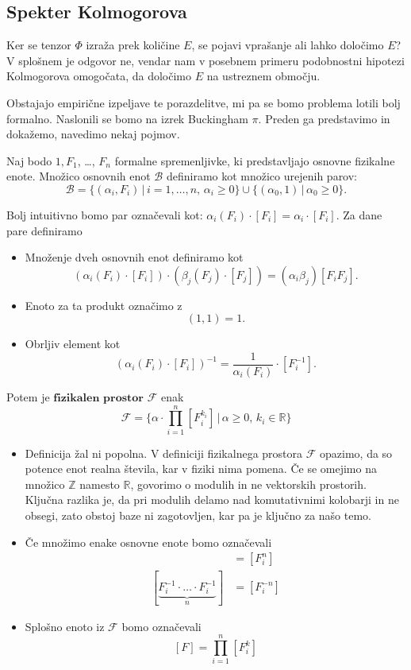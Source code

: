\documentclass[mat2, tisk]{fmfdelo}
\newcommand{\R}{\mathbb R}
\newcommand{\Z}{\mathbb Z}
\newcommand{\bd}{\textbf}
\begin{document}
\subsection{Spekter Kolmogorova}
\label{Buck}

Ker se tenzor $\Phi$ izraža prek količine $E$, se pojavi vprašanje 
ali lahko določimo $E$? V splošnem je odgovor ne, vendar nam v posebnem 
primeru podobnostni hipotezi Kolmogorova omogočata, da določimo
$E$ na ustreznem območju.

Obstajajo empirične izpeljave te porazdelitve, mi pa se bomo problema lotili 
bolj formalno. Naslonili se bomo na izrek Buckingham $\pi$.
Preden ga predstavimo in dokažemo, navedimo nekaj pojmov. 

\begin{definicija}
Naj bodo $1, F_1$, \dots, $F_n$ formalne spremenljivke, ki predstavljajo 
osnovne fizikalne enote. Množico osnovnih enot $\mathcal{B}$ definiramo kot 
množico urejenih parov: 
$$
\mathcal{B} = \{(\alpha_i, F_i) \,|\, i= 1, \dots, n, \, \alpha_i \geq 0\} \cup \{(\alpha_0, 1) \,|\, \alpha_0 \geq 0\}.
$$

Bolj intuitivno bomo par označevali kot: $\alpha_i(F_i)\cdot [F_i] = \alpha_i \cdot [F_i]$. 
Za dane pare definiramo 
\begin{itemize}
  \item Množenje dveh osnovnih enot definiramo kot  
  $$
  (\alpha_i(F_i)\cdot [F_i]) \cdot (\beta_j(F_j)\cdot [F_j]) = (\alpha_i \beta_j)[F_i F_j].
  $$
  \item Enoto za ta produkt označimo z 
  $$
  (1, 1) = 1.
  $$
  \item Obrljiv element kot 
  $$
  (\alpha_i(F_i)\cdot [F_i])^{-1} = \frac{1}{\alpha_i{(F_i)}} \cdot [F_i^{-1}].
  $$

\end{itemize}

Potem je $\bd{fizikalen prostor}$ $\mathcal{F}$ enak 
$$
\mathcal{F} = \{\alpha \cdot \prod_{i=1}^n [F_i^{k_i}] \,|\, \alpha \geq 0,\, k_i\in \R\}
$$
\end{definicija}

\begin{opomba}
\hfill
\begin{itemize}
 \item Definicija žal ni popolna. V definiciji fizikalnega prostora $\mathcal{F}$
 opazimo, da so potence enot realna števila, kar v fiziki nima pomena. 
 Če se omejimo na množico $\Z$ namesto $\R$, govorimo 
 o modulih in ne vektorskih prostorih. Ključna razlika je, da pri modulih delamo nad 
 komutativnimi kolobarji in ne obsegi, zato obstoj baze ni zagotovljen, kar pa 
 je ključno za našo temo.
 \item Če množimo enake osnovne enote bomo označevali
  \begin{align*}
    [\underbrace{F_i \cdot \ldots \cdot F_i}_n] &= [F^n_i] \\
    [\underbrace{F_i^{-1} \cdot \dots \cdot F_i^{-1}}_n] &= [F^{-n}_{i}]
  \end{align*}
\item Splošno enoto iz $\mathcal{F}$ bomo označevali 
$$
[F] = \prod_{i=1}^n [F_i^{k}]
$$
\end{itemize}
\end{opomba}
\end{document}
